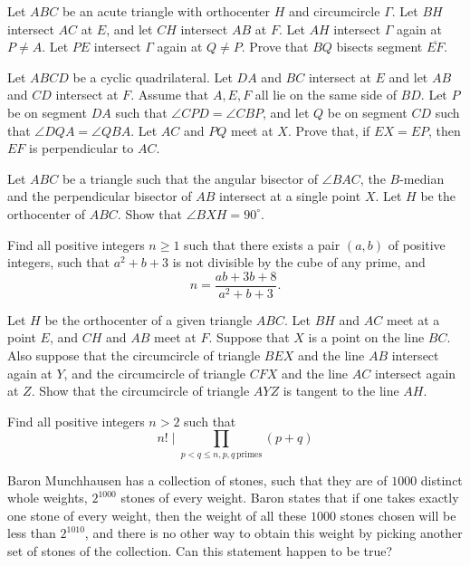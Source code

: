 \documentclass[11pt]{scrartcl}
\begin{document}
\begin{problem}[8528437132500966626]
	Let $ABC$ be an acute triangle with orthocenter $H$ and circumcircle $\Gamma$. Let $BH$ intersect $AC$ at $E$, and let $CH$ intersect $AB$ at $F$. Let $AH$ intersect $\Gamma$ again at $P \neq A$. Let $PE$ intersect $\Gamma$ again at $Q \neq P$. Prove that $BQ$ bisects segment $\overline{EF}$.
\end{problem}
\begin{problem}[3353450172272500341]
Let $ABCD$ be a cyclic quadrilateral. Let $DA$ and $BC$ intersect at $E$ and let $AB$ and $CD$
intersect at $F$. Assume that $A, E, F$ all lie on the same side of $BD$. Let $P$ be on segment $DA$
such that $\angle CPD = \angle CBP$, and let $Q$ be on segment $CD$ such that $\angle DQA = \angle QBA$. Let $AC$ and $PQ$ meet at $X$. Prove that, if $EX = EP$, then $EF$ is perpendicular to $AC$.
\end{problem}
\begin{problem}[264456837378391]
Let $ABC$ be a triangle such that the angular bisector of $\angle BAC$, the $B$-median and the perpendicular bisector of $AB$ intersect at a single point $X$. Let $H$ be the orthocenter of $ABC$. Show that $\angle BXH = 90^{\circ}$.
\end{problem}
\begin{problem}[4375421764909014892]
	Find all positive integers $n\geq1$ such that there exists a pair $(a,b)$ of positive integers, such that $a^2+b+3$ is not divisible by the cube of any prime, and$$n=\frac{ab+3b+8}{a^2+b+3}.$$
\end{problem}
\begin{problem}[119129720704350]
Let $H$ be the orthocenter of a given triangle $ABC$. Let $BH$ and $AC$ meet at a point $E$, and $CH$ and $AB$ meet at $F$. Suppose that $X$ is a point on the line $BC$. Also suppose that the circumcircle of triangle $BEX$ and the line $AB$ intersect again at $Y$, and the circumcircle of triangle $CFX$ and the line $AC$ intersect again at $Z$.
Show that the circumcircle of triangle $AYZ$ is tangent to the line $AH$.
\end{problem}
\begin{problem}[6919176010062551987]
Find all positive integers $n>2$ such that
$$ n! \mid \prod_{ p<q\le n, p,q \, \text{primes}} (p+q)$$
\end{problem}
\begin{problem}[9055967412808709037]
Baron Munchhausen has a collection of stones, such that they are of $1000$ distinct whole weights, $2^{1000}$ stones of every weight. Baron states that if one takes exactly one stone of every weight, then the weight of all these $1000$ stones chosen will be less than $2^{1010}$, and there is no other way to obtain this weight by picking another set of stones of the collection.
Can this statement happen to be true?
\end{problem}
\end{document}
